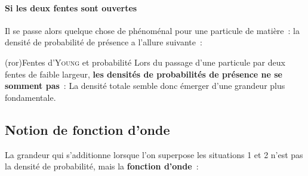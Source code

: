 \documentclass[../../main/main.tex]{subfiles}
\begin{document}
\begin{minipage}[c]{.55\linewidth}
	\paragraph*{Si les deux fentes sont ouvertes}
	Il se passe alors quelque chose de phénoménal pour une particule de matière~: la
	densité de probabilité de présence a l'allure suivante~:
\end{minipage}
\hfill
\begin{minipage}[c]{.43\linewidth}
	\begin{center}
	\end{center}
\end{minipage}

\begin{tcb*}(ror){Fentes d'\textsc{Young} et probabilité}
	Lors du passage d'une particule par deux fentes de faible largeur, \textbf{les
		densités de probabilités de présence ne se somment pas}~:
	\psw{%
		\[
			p (x) \neq p_1 (x) + p_2 (x)
		\]
	}%
	La densité totale semble donc émerger d'une grandeur plus fondamentale.
\end{tcb*}

\subsection{Notion de fonction d'onde}
\label{ssec:fonconde}
La grandeur qui s'additionne lorsque l'on superpose les situations 1 et 2 n'est
pas la densité de probabilité, mais la \textbf{fonction d'onde}~:
\end{document}
